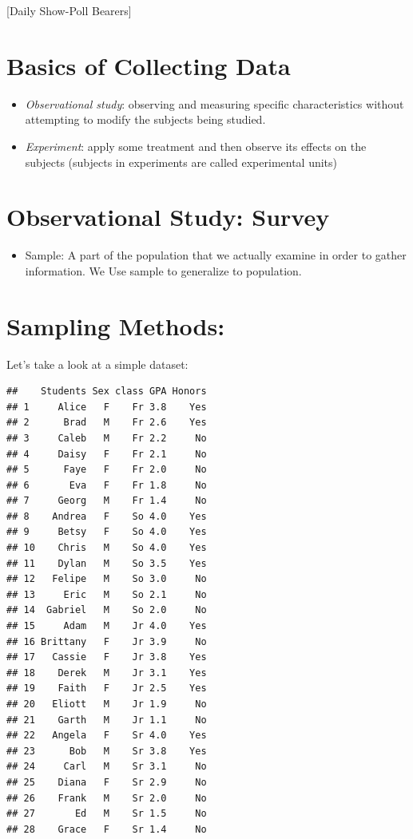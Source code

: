 \documentclass[]{book}
\providecommand{\tightlist}{%
  \setlength{\itemsep}{0pt}\setlength{\parskip}{0pt}}
\begin{document}
{[}Daily Show-Poll Bearers{]}

\hypertarget{basics-of-collecting-data}{%
\section{Basics of Collecting Data}\label{basics-of-collecting-data}}

\begin{itemize}
\item
  \emph{Observational study}: observing and measuring specific characteristics without attempting to modify the subjects being studied.
\item
  \emph{Experiment}: apply some treatment and then observe its effects on the subjects (subjects in experiments are called experimental units)
\end{itemize}

\hypertarget{observational-study-survey}{%
\section{Observational Study: Survey}\label{observational-study-survey}}

\begin{itemize}
\tightlist
\item
  Sample: A part of the population that we actually examine in order to gather information. We Use sample to generalize to population.
\end{itemize}

\hypertarget{sampling-methods}{%
\section{Sampling Methods:}\label{sampling-methods}}

Let's take a look at a simple dataset:

\begin{verbatim}
##    Students Sex class GPA Honors
## 1     Alice   F    Fr 3.8    Yes
## 2      Brad   M    Fr 2.6    Yes
## 3     Caleb   M    Fr 2.2     No
## 4     Daisy   F    Fr 2.1     No
## 5      Faye   F    Fr 2.0     No
## 6       Eva   F    Fr 1.8     No
## 7     Georg   M    Fr 1.4     No
## 8    Andrea   F    So 4.0    Yes
## 9     Betsy   F    So 4.0    Yes
## 10    Chris   M    So 4.0    Yes
## 11    Dylan   M    So 3.5    Yes
## 12   Felipe   M    So 3.0     No
## 13     Eric   M    So 2.1     No
## 14  Gabriel   M    So 2.0     No
## 15     Adam   M    Jr 4.0    Yes
## 16 Brittany   F    Jr 3.9     No
## 17   Cassie   F    Jr 3.8    Yes
## 18    Derek   M    Jr 3.1    Yes
## 19    Faith   F    Jr 2.5    Yes
## 20   Eliott   M    Jr 1.9     No
## 21    Garth   M    Jr 1.1     No
## 22   Angela   F    Sr 4.0    Yes
## 23      Bob   M    Sr 3.8    Yes
## 24     Carl   M    Sr 3.1     No
## 25    Diana   F    Sr 2.9     No
## 26    Frank   M    Sr 2.0     No
## 27       Ed   M    Sr 1.5     No
## 28    Grace   F    Sr 1.4     No
\end{verbatim}
\end{document}
